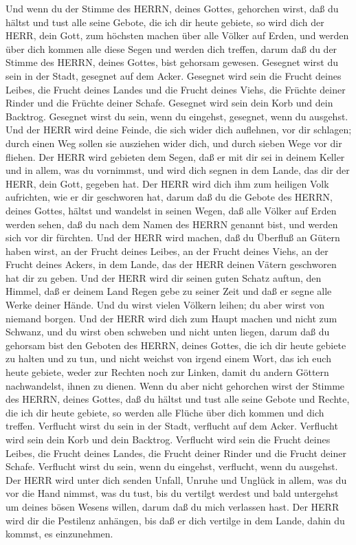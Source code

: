  Und wenn du der Stimme des HERRN, deines Gottes, gehorchen
wirst, daß du hältst und tust alle seine Gebote, die ich dir heute
gebiete, so wird dich der HERR, dein Gott, zum höchsten machen über alle
Völker auf Erden,  und werden über dich kommen alle diese
Segen und werden dich treffen, darum daß du der Stimme des HERRN, deines
Gottes, bist gehorsam gewesen.  Gesegnet wirst du sein in
der Stadt, gesegnet auf dem Acker.  Gesegnet wird sein die
Frucht deines Leibes, die Frucht deines Landes und die Frucht deines
Viehs, die Früchte deiner Rinder und die Früchte deiner Schafe.
 Gesegnet wird sein dein Korb und dein Backtrog.
 Gesegnet wirst du sein, wenn du eingehst, gesegnet, wenn du
ausgehst.  Und der HERR wird deine Feinde, die sich wider
dich auflehnen, vor dir schlagen; durch einen Weg sollen sie ausziehen
wider dich, und durch sieben Wege vor dir fliehen.  Der HERR
wird gebieten dem Segen, daß er mit dir sei in deinem Keller und in
allem, was du vornimmst, und wird dich segnen in dem Lande, das dir der
HERR, dein Gott, gegeben hat.  Der HERR wird dich ihm zum
heiligen Volk aufrichten, wie er dir geschworen hat, darum daß du die
Gebote des HERRN, deines Gottes, hältst und wandelst in seinen Wegen,
 daß alle Völker auf Erden werden sehen, daß du nach dem
Namen des HERRN genannt bist, und werden sich vor dir fürchten.
 Und der HERR wird machen, daß du Überfluß an Gütern haben
wirst, an der Frucht deines Leibes, an der Frucht deines Viehs, an der
Frucht deines Ackers, in dem Lande, das der HERR deinen Vätern
geschworen hat dir zu geben.  Und der HERR wird dir seinen
guten Schatz auftun, den Himmel, daß er deinem Land Regen gebe zu seiner
Zeit und daß er segne alle Werke deiner Hände. Und du wirst vielen
Völkern leihen; du aber wirst von niemand borgen.  Und der
HERR wird dich zum Haupt machen und nicht zum Schwanz, und du wirst oben
schweben und nicht unten liegen, darum daß du gehorsam bist den Geboten
des HERRN, deines Gottes, die ich dir heute gebiete zu halten und zu
tun,  und nicht weichst von irgend einem Wort, das ich euch
heute gebiete, weder zur Rechten noch zur Linken, damit du andern
Göttern nachwandelst, ihnen zu dienen.  Wenn du aber nicht
gehorchen wirst der Stimme des HERRN, deines Gottes, daß du hältst und
tust alle seine Gebote und Rechte, die ich dir heute gebiete, so werden
alle Flüche über dich kommen und dich treffen.  Verflucht
wirst du sein in der Stadt, verflucht auf dem Acker. 
Verflucht wird sein dein Korb und dein Backtrog.  Verflucht
wird sein die Frucht deines Leibes, die Frucht deines Landes, die Frucht
deiner Rinder und die Frucht deiner Schafe.  Verflucht
wirst du sein, wenn du eingehst, verflucht, wenn du ausgehst.
 Der HERR wird unter dich senden Unfall, Unruhe und Unglück
in allem, was du vor die Hand nimmst, was du tust, bis du vertilgt
werdest und bald untergehst um deines bösen Wesens willen, darum daß du
mich verlassen hast.  Der HERR wird dir die Pestilenz
anhängen, bis daß er dich vertilge in dem Lande, dahin du kommst, es
einzunehmen.

